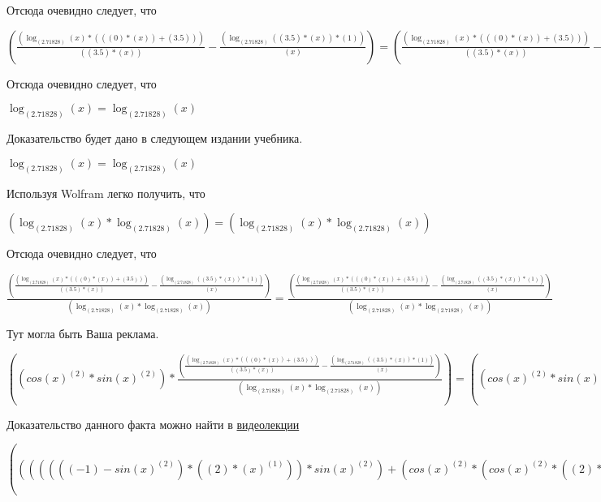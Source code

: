 \documentclass[12pt,a4paper,fleqn]{article}
\theoremstyle{definition}
\begin{document}
Отсюда очевидно следует, что

$(\frac{(\log_{( 2.71828 )}{( x )} * ((( 0 ) * ( x )) + ( 3.5 )))}{(( 3.5 ) * ( x ))}
 - \frac{(\log_{( 2.71828 )}{(( 3.5 ) * ( x ))} * ( 1 ))}{( x )}
) = (\frac{(\log_{( 2.71828 )}{( x )} * ((( 0 ) * ( x )) + ( 3.5 )))}{(( 3.5 ) * ( x ))}
 - \frac{(\log_{( 2.71828 )}{(( 3.5 ) * ( x ))} * ( 1 ))}{( x )}
)$

Отсюда очевидно следует, что

$\log_{( 2.71828 )}{( x )} = \log_{( 2.71828 )}{( x )}$

Доказательство будет дано в следующем издании учебника.

$\log_{( 2.71828 )}{( x )} = \log_{( 2.71828 )}{( x )}$

Используя Wolfram легко получить, что

$(\log_{( 2.71828 )}{( x )} * \log_{( 2.71828 )}{( x )}) = (\log_{( 2.71828 )}{( x )} * \log_{( 2.71828 )}{( x )})$

Отсюда очевидно следует, что

$\frac{(\frac{(\log_{( 2.71828 )}{( x )} * ((( 0 ) * ( x )) + ( 3.5 )))}{(( 3.5 ) * ( x ))}
 - \frac{(\log_{( 2.71828 )}{(( 3.5 ) * ( x ))} * ( 1 ))}{( x )}
)}{(\log_{( 2.71828 )}{( x )} * \log_{( 2.71828 )}{( x )})}
 = \frac{(\frac{(\log_{( 2.71828 )}{( x )} * ((( 0 ) * ( x )) + ( 3.5 )))}{(( 3.5 ) * ( x ))}
 - \frac{(\log_{( 2.71828 )}{(( 3.5 ) * ( x ))} * ( 1 ))}{( x )}
)}{(\log_{( 2.71828 )}{( x )} * \log_{( 2.71828 )}{( x )})}
$

Тут могла быть Ваша реклама.

$((cos{( x )}^{( 2 )} * sin{( x )}^{( 2 )}) * \frac{(\frac{(\log_{( 2.71828 )}{( x )} * ((( 0 ) * ( x )) + ( 3.5 )))}{(( 3.5 ) * ( x ))}
 - \frac{(\log_{( 2.71828 )}{(( 3.5 ) * ( x ))} * ( 1 ))}{( x )}
)}{(\log_{( 2.71828 )}{( x )} * \log_{( 2.71828 )}{( x )})}
) = ((cos{( x )}^{( 2 )} * sin{( x )}^{( 2 )}) * \frac{(\frac{(\log_{( 2.71828 )}{( x )} * ((( 0 ) * ( x )) + ( 3.5 )))}{(( 3.5 ) * ( x ))}
 - \frac{(\log_{( 2.71828 )}{(( 3.5 ) * ( x ))} * ( 1 ))}{( x )}
)}{(\log_{( 2.71828 )}{( x )} * \log_{( 2.71828 )}{( x )})}
)$

Доказательство данного факта можно найти в \href{https://www.youtube.com/watch?v=dQw4w9WgXcQ}{видеолекции}

$((((((( -1 ) - sin{( x )}^{( 2 )}) * (( 2 ) * {( x )}^{( 1 )})) * sin{( x )}^{( 2 )}) + (cos{( x )}^{( 2 )} * (cos{( x )}^{( 2 )} * (( 2 ) * {( x )}^{( 1 )})))) * \log_{( x )}{(( 3.5 ) * ( x ))}) + ((cos{( x )}^{( 2 )} * sin{( x )}^{( 2 )}) * \frac{(\frac{(\log_{( 2.71828 )}{( x )} * ((( 0 ) * ( x )) + ( 3.5 )))}{(( 3.5 ) * ( x ))}
 - \frac{(\log_{( 2.71828 )}{(( 3.5 ) * ( x ))} * ( 1 ))}{( x )}
)}{(\log_{( 2.71828 )}{( x )} * \log_{( 2.71828 )}{( x )})}
)) = ((((((( -1 ) - sin{( x )}^{( 2 )}) * (( 2 ) * {( x )}^{( 1 )})) * sin{( x )}^{( 2 )}) + (cos{( x )}^{( 2 )} * (cos{( x )}^{( 2 )} * (( 2 ) * {( x )}^{( 1 )})))) * \log_{( x )}{(( 3.5 ) * ( x ))}) + ((cos{( x )}^{( 2 )} * sin{( x )}^{( 2 )}) * \frac{(\frac{(\log_{( 2.71828 )}{( x )} * ((( 0 ) * ( x )) + ( 3.5 )))}{(( 3.5 ) * ( x ))}
 - \frac{(\log_{( 2.71828 )}{(( 3.5 ) * ( x ))} * ( 1 ))}{( x )}
)}{(\log_{( 2.71828 )}{( x )} * \log_{( 2.71828 )}{( x )})}
))$
\end{document}
